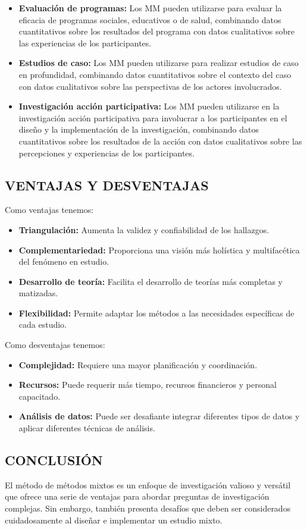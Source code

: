 \begin{itemize}
    \item \textbf{Evaluación de programas:} Los MM pueden utilizarse para evaluar la eficacia de programas sociales, educativos o de salud, combinando datos cuantitativos sobre los resultados del programa con datos cualitativos sobre las experiencias de los participantes.
    \item \textbf{Estudios de caso:} Los MM pueden utilizarse para realizar estudios de caso en profundidad, combinando datos cuantitativos sobre el contexto del caso con datos cualitativos sobre las perspectivas de los actores involucrados.
    \item \textbf{Investigación acción participativa:} Los MM pueden utilizarse en la investigación acción participativa para involucrar a los participantes en el diseño y la implementación de la investigación, combinando datos cuantitativos sobre los resultados de la acción con datos cualitativos sobre las percepciones y experiencias de los participantes.
\end{itemize}

\subsection{VENTAJAS Y DESVENTAJAS}

Como ventajas tenemos:

\begin{itemize}
    \item \textbf{Triangulación:} Aumenta la validez y confiabilidad de los hallazgos.
    \item \textbf{Complementariedad:} Proporciona una visión más holística y multifacética del fenómeno en estudio.
    \item \textbf{Desarrollo de teoría:} Facilita el desarrollo de teorías más completas y matizadas.
    \item \textbf{Flexibilidad:} Permite adaptar los métodos a las necesidades específicas de cada estudio.
\end{itemize}

Como desventajas tenemos:
\begin{itemize}
    \item \textbf{Complejidad:} Requiere una mayor planificación y coordinación.
    \item \textbf{Recursos:} Puede requerir más tiempo, recursos financieros y personal capacitado.
    \item \textbf{Análisis de datos:} Puede ser desafiante integrar diferentes tipos de datos y aplicar diferentes técnicas de análisis.
\end{itemize}

\subsection{CONCLUSIÓN}

El método de métodos mixtos es un enfoque de investigación valioso y versátil que ofrece una serie de ventajas para abordar preguntas de investigación complejas. Sin embargo, también presenta desafíos que deben ser considerados cuidadosamente al diseñar e implementar un estudio mixto.
